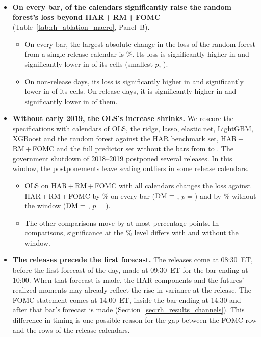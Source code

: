 \begin{itemize}
\begin{itemize}
    The random forest's change of \rhabRfAddRmFomcMacCpiRelPct\% is not significant
    ($p = {}$\rhabRfAddRmFomcMacCpiRelP).
  \end{itemize}
\item \textbf{On every bar, \rhmsPanBAllForestNSigHigher{} of the \rhabNMacReleases{} calendars significantly raise the
  random forest's loss beyond HAR\,+\,RM\,+\,FOMC} (Table~\ref{tab:rh_ablation_macro}, Panel~B).
  \begin{itemize}
  \item On every bar, the largest absolute change in the loss of the random forest from a single release calendar is
    \rhmsPanBAllForestMaxAbsPct\%. Its loss is significantly higher in \rhmsPanBAllForestNSigHigher{} and
    significantly lower in \rhmsPanBAllForestNSigLower{} of its \rhmsPanBAllForestNCells{} cells (smallest $p$,
    \rhmsPanBAllForestPMin).
  \item On non-release days, its loss is significantly higher in \rhmsPanBNrelForestNSigHigher{} and significantly
    lower in \rhmsPanBNrelForestNSigLower{} of its cells. On release days, it is significantly higher in
    \rhmsPanBRelForestNSigHigher{} and significantly lower in \rhmsPanBRelForestNSigLower{} of them.
  \end{itemize}
\item \textbf{Without early 2019, the OLS's increase shrinks.} We rescore the specifications with calendars of OLS, the
  ridge, lasso, elastic net, LightGBM, XGBoost and the random forest against the HAR benchmark set,
  HAR\,+\,RM\,+\,FOMC and the full predictor set without the bars from \rhmsRobustExclFirst{} to
  \rhmsRobustExclLast. The government shutdown of
  2018--2019 postponed several releases. In this window, the postponements leave scaling outliers in some release
  calendars.
  \begin{itemize}
  \item OLS on HAR\,+\,RM\,+\,FOMC with all \rhabNMacReleases{} calendars changes the loss against
    HAR\,+\,RM\,+\,FOMC by \rhmsRobustOlsAllPct\% on every bar ($\mathrm{DM} = {}$\rhmsRobustOlsAllDm,
    $p = {}$\rhmsRobustOlsAllP) and by \rhmsRobustOlsExPct\% without the window ($\mathrm{DM} = {}$\rhmsRobustOlsExDm,
    $p = {}$\rhmsRobustOlsExP).
  \item The other \rhmsRobustNOther{} comparisons move by at most \rhmsRobustOtherMaxMove{} percentage points. In
    \rhmsRobustNSigCross{} comparisons, significance at the \rhmsSigLevel\% level differs with and without the
    window.
  \end{itemize}
\item \textbf{The releases precede the first forecast.} The releases come at 08:30~ET, before the
  first forecast of the
  day, made at 09:30~ET for the bar ending at 10:00. When that forecast is made, the HAR components and the futures'
  realized moments may already reflect the rise in variance at the release. The FOMC statement comes at 14:00~ET,
  inside the bar ending at 14:30 and after that bar's forecast is made (Section~\ref{sec:rh_results_channels}). This
  difference in timing is one possible reason for the gap between the FOMC row and the rows of the release calendars.
\end{itemize}
